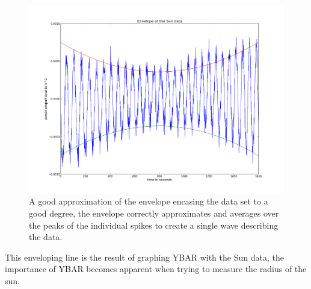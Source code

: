 \documentclass[12 pt]{article}
\begin{document}
\begin{figure}[H]
\centering
\includegraphics[scale=0.45]{sunenvelope.png}
\caption{A good approximation of the envelope encasing the data set to a
good degree, the envelope correctly approximates and averages
over the peaks of the individual spikes to create a single wave
describing the data.}
\label{sunenvelope}
\end{figure}
This enveloping line is the result of graphing YBAR with the Sun data,
the importance of YBAR becomes apparent when trying to measure the
radius of the sun. 
\end{document}
